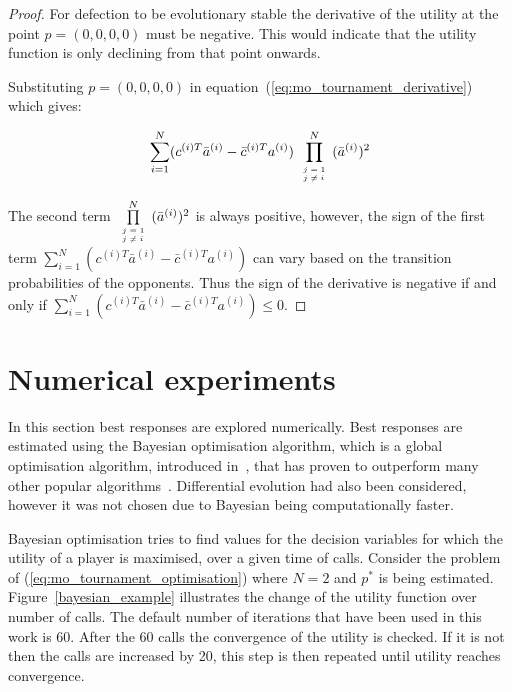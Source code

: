 \documentclass[10pt]{article}
\begin{document}
\begin{proof}
    For defection to be evolutionary stable the derivative of the utility
    at the point \(p = (0, 0, 0, 0)\) must be negative. This would indicate that
    the utility function is only declining from that point onwards.

    Substituting \(p = (0, 0, 0, 0)\) in
    equation~(\ref{eq:mo_tournament_derivative}) which gives:

    \begin{equation}
    \sum_{i=1} ^ N (c^{(i)T} \bar{a}^{(i)} - \bar{c}^{(i)T} a^{(i)})
    \prod\limits_{\tiny\begin{array}{l} j=1 \\ j \neq i \end{array}} ^ N (\bar{a}^{(i)})^2
    \end{equation}
    
    The second term \(\prod\limits_{\tiny\begin{array}{l} j=1 \\ j \neq i
    \end{array}} ^ N (\bar{a}^{(i)})^2\) is always positive, however, the sign of the
    first term \(\sum_{i=1} ^ N (c^{(i)T} \bar{a}^{(i)} - \bar{c}^{(i)T} a^{(i)})\)
    can vary based on the transition probabilities of the opponents. Thus the
    sign of the derivative is negative if and only if
    \(\sum_{i=1} ^ N (c^{(i)T} \bar{a}^{(i)} - \bar{c}^{(i)T} a^{(i)}) \leq 0\).
\end{proof}

\section{Numerical experiments} \label{section:numerical_experiments}

In this section best responses are explored numerically. Best responses are
estimated using the Bayesian optimisation algorithm, which is a
global optimisation algorithm, introduced in~\cite{Mokus1978}, that has proven
to outperform many other popular algorithms~\cite{Jones2001}. Differential
evolution had also been considered, however it was not chosen due to Bayesian
being computationally faster.

Bayesian optimisation tries to find values for the decision variables for which
the utility of a player is maximised, over a given time of calls. Consider
the problem of (\ref{eq:mo_tournament_optimisation}) where \(N=2\) and \(p^*\)
is being estimated. Figure~\ref{bayesian_example} illustrates
the change of the utility function over number of calls.
The default number of iterations that have been used in this work is 60. After
the 60 calls the convergence of the utility is checked. If it is not then the
calls are increased by 20, this step is then repeated until utility reaches
convergence.
\end{document}
